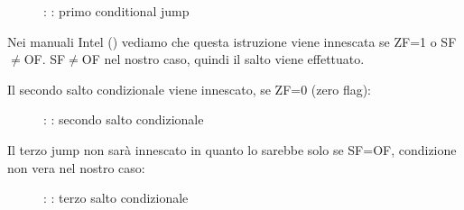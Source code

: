 \begin{figure}[H]
\centering
{}
\caption{\olly: : primo conditional jump}
\label{fig:jcc_olly_signed_1}
\end{figure}

Nei manuali Intel () vediamo che questa istruzione viene innescata se ZF=1 o SF$\neq$OF.
SF$\neq$OF nel nostro caso, quindi il salto viene effettuato.

\clearpage
Il secondo salto condizionale \JNZ viene innescato, se ZF=0 (zero flag):

\begin{figure}[H]
\centering
{}
\caption{\olly: : secondo salto condizionale}
\label{fig:jcc_olly_signed_2}
\end{figure}

\clearpage
Il terzo jump \JGE non sarà innescato in quanto lo sarebbe solo se SF=OF, condizione non vera nel nostro caso:

\begin{figure}[H]
\centering
{}
\caption{\olly: : terzo salto condizionale}
\label{fig:jcc_olly_signed_3}
\end{figure}

